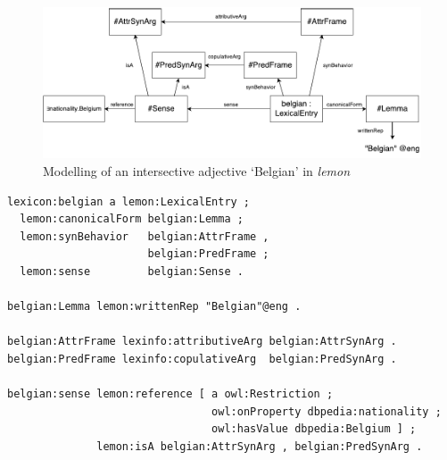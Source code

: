 \documentclass[11pt]{article}
\begin{document}
\begin{figure}
\includegraphics[width=\textwidth]{belgian-example}
\caption{Modelling of an intersective adjective `Belgian' in \emph{lemon}\label{example-belgian}}
\end{figure}

\begin{small}\begin{verbatim}
lexicon:belgian a lemon:LexicalEntry ;
  lemon:canonicalForm belgian:Lemma ;
  lemon:synBehavior   belgian:AttrFrame , 
                      belgian:PredFrame ;
  lemon:sense         belgian:Sense .

belgian:Lemma lemon:writtenRep "Belgian"@eng .

belgian:AttrFrame lexinfo:attributiveArg belgian:AttrSynArg .
belgian:PredFrame lexinfo:copulativeArg  belgian:PredSynArg .

belgian:sense lemon:reference [ a owl:Restriction ;
                                owl:onProperty dbpedia:nationality ;
                                owl:hasValue dbpedia:Belgium ] ;
              lemon:isA belgian:AttrSynArg , belgian:PredSynArg .
\end{verbatim}\end{small}
\end{document}
